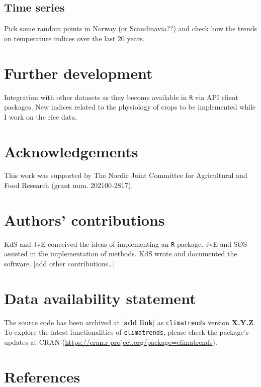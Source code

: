 \documentclass[
]{article}
\begin{document}
\hypertarget{time-series}{%
\subsection{Time series}\label{time-series}}

Pick some random points in Norway (or Scandinavia??) and check how the
trends on temperature indices over the last 20 years.

\hypertarget{further-development}{%
\section{Further development}\label{further-development}}

Integration with other datasets as they become available in \texttt{R}
via API client packages. New indices related to the physiology of crops
to be implemented while I work on the rice data.

\hypertarget{acknowledgements}{%
\section{Acknowledgements}\label{acknowledgements}}

This work was supported by The Nordic Joint Committee for Agricultural
and Food Research (grant num. 202100-2817).

\hypertarget{authors-contributions}{%
\section{Authors' contributions}\label{authors-contributions}}

KdS and JvE conceived the ideas of implementing an \texttt{R} package.
JvE and SØS assisted in the implementation of methods. KdS wrote and
documented the software. {[}add other contributions\ldots{]}

\hypertarget{data-availability-statement}{%
\section{Data availability
statement}\label{data-availability-statement}}

The source code has been archived at {[}\textbf{add link}{]} as
\texttt{climatrends} version \textbf{X.Y.Z}. To explore the latest
functionalities of \texttt{climatrends}, please check the package's
updates at CRAN (\url{https://cran.r-project.org/package=climatrends}).

\hypertarget{references}{%
\section{References}\label{references}}
\end{document}

